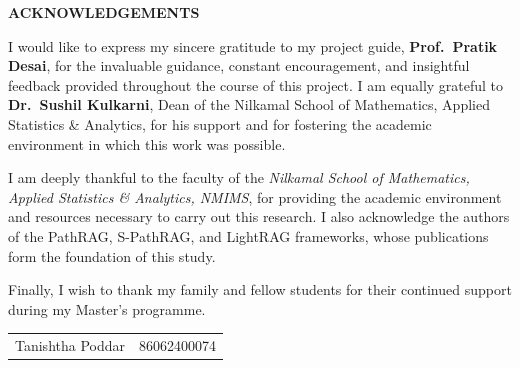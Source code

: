 \documentclass[12pt,a4paper,oneside]{report}
\begin{document}
\begin{titlepage}
    \thispagestyle{empty}
    \vspace*{1cm}
    \begin{center}
        {\LARGE\bfseries ACKNOWLEDGEMENTS}
    \end{center}
    \vspace{1cm}

    \noindent I would like to express my sincere gratitude to my project
    guide, \textbf{Prof.\ Pratik Desai}, for the invaluable guidance,
    constant encouragement, and insightful feedback provided throughout the
    course of this project. I am equally grateful to
    \textbf{Dr.\ Sushil Kulkarni}, Dean of the Nilkamal School of
    Mathematics, Applied Statistics \& Analytics, for his support and for
    fostering the academic environment in which this work was possible.

    I am deeply thankful to the faculty of the \textit{Nilkamal School of
    Mathematics, Applied Statistics \& Analytics, NMIMS}, for providing the
    academic environment and resources necessary to carry out this research.
    I also acknowledge the authors of the PathRAG, S-PathRAG, and LightRAG
    frameworks, whose publications form the foundation of this study.

    Finally, I wish to thank my family and fellow students for their
    continued support during my Master's programme.

    \vfill

    \begin{flushright}
        \begin{tabular}{@{}l l@{}}
            Tanishtha Poddar       & 86062400074 \\
        \end{tabular}
    \end{flushright}
\end{titlepage}

\pagestyle{frontmatter}

\tableofcontents
\clearpage

\listoffigures
\clearpage

\listoftables
\clearpage
\end{document}
